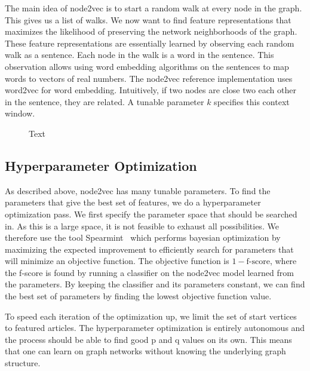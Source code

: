 The main idea of node2vec is to start a random walk at every node in the graph. This gives us a list of walks. We now want to find feature representations that maximizes the likelihood of preserving the network neighborhoods of the graph. These feature representations are essentially learned by observing each random walk as a sentence. Each node in the walk is a word in the sentence. This observation allows using word embedding algorithms on the sentences to map words to vectors of real numbers. The node2vec reference implementation uses word2vec for word embedding. Intuitively, if two nodes are close two each other in the sentence, they are related. A tunable parameter $k$ specifies this context window. 



\begin{figure}[tbp]%
  \centering
  

\caption[short desc]{Text}%
\label{fig:n2v-figure}%
\end{figure}


\subsection{Hyperparameter Optimization}
As described above, node2vec has many tunable parameters. To find the parameters that give the best set of features, we do a hyperparameter optimization pass. We first specify the parameter space that should be searched in. As this is a large space, it is not feasible to exhaust all possibilities. We therefore use the tool Spearmint~\cite{snoek2012practical} which performs bayesian optimization by maximizing the expected improvement to efficiently search for parameters that will minimize an objective function. The objective function is $1 - \text{f-score}$, where the f-score is found by running a classifier on the node2vec model learned from the parameters. By keeping the classifier and its parameters constant, we can find the best set of parameters by finding the lowest objective function value.

To speed each iteration of the optimization up, we limit the set of start vertices to featured articles. The hyperparameter optimization is entirely autonomous and the process should be able to find good p and q values on its own. This means that one can learn on graph networks without knowing the underlying graph structure.

